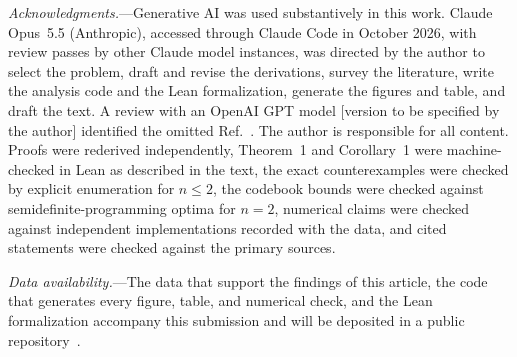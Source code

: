\documentclass[aps,prl,reprint,superscriptaddress,amsmath,amssymb]{revtex4-2}
\begin{document}
\emph{Acknowledgments.}---Generative AI was used substantively in this work.
Claude Opus~5.5 (Anthropic), accessed through Claude Code in October 2026, with
review passes by other Claude model instances, was directed by the author to
select the problem, draft and revise the derivations, survey the literature,
write the analysis code and the Lean formalization, generate the figures and
table, and draft the text. A review with an OpenAI GPT model [version to be
specified by the author] identified the omitted Ref.~\cite{Ibarrondo}. The
author is responsible for all content. Proofs were rederived independently,
Theorem~1 and Corollary~1 were machine-checked in Lean as described in the
text, the exact counterexamples were checked by explicit enumeration for
$n\le2$, the codebook bounds were checked against semidefinite-programming
optima for $n=2$, numerical claims were checked against independent
implementations recorded with the data, and cited statements were checked
against the primary sources.

\emph{Data availability.}---The data that support the findings of this article,
the code that generates every figure, table, and numerical check, and the Lean
formalization accompany this submission and will be deposited in a public
repository~\cite{DataRepo}.
\end{document}
